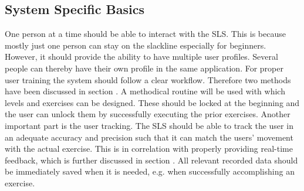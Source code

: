 \subsection{System Specific Basics}\label{systemBasics}
One person at a time should be able to interact with the SLS.
This is because mostly just one person can stay on the slackline especially for beginners.
However, it should provide the ability to have multiple user profiles.
Several people can thereby have their own profile in the same application.
For proper user training the system should follow a clear workflow.
Therefore two methods have been discussed in section \textit{}.
A methodical routine will be used with which levels and exercises can be designed.
These should be locked at the beginning and the user can unlock them by successfully executing the prior exercises.
Another important part is the user tracking.
The SLS should be able to track the user in an adequate accuracy and precision such that it can match the users' movement with the actual exercise. %
This is in correlation with properly providing real-time feedback, which is further discussed in section \textit{}.
All relevant recorded data should be immediately saved when it is needed, e.g. when successfully accomplishing an exercise.

\begin{comment}
- System should be able to track user appropriately
- All relevant data should be immediately saved when it is needed (unlocking exercise/stage, failing/accomplish exercise)
- Information about where the user currently is should be given --> title
- User selection
- Also a possibility to go to the last screen if she misclicks should be given.
\end{comment}